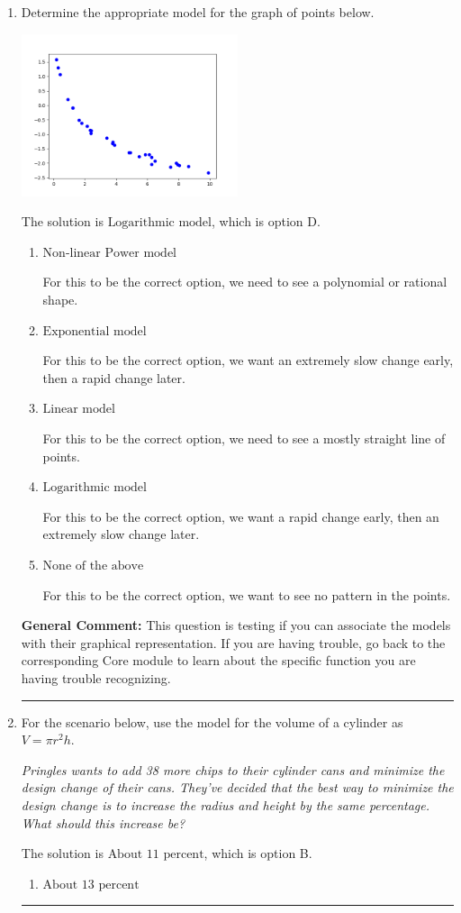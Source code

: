 \documentclass{extbook}[14pt]
\newcommand{\litem}[1]{\item #1

\rule{\textwidth}{0.4pt}}
\begin{document}
\begin{enumerate}\litem{
Determine the appropriate model for the graph of points below.

\begin{center}
    \includegraphics[width=0.5\textwidth]{../Figures/identifyModelGraph12A.png}
\end{center}


The solution is \( \text{Logarithmic model} \), which is option D.\begin{enumerate}[label=\Alph*.]
\item \( \text{Non-linear Power model} \)

For this to be the correct option, we need to see a polynomial or rational shape.
\item \( \text{Exponential model} \)

For this to be the correct option, we want an extremely slow change early, then a rapid change later.
\item \( \text{Linear model} \)

For this to be the correct option, we need to see a mostly straight line of points.
\item \( \text{Logarithmic model} \)

For this to be the correct option, we want a rapid change early, then an extremely slow change later.
\item \( \text{None of the above} \)

For this to be the correct option, we want to see no pattern in the points.
\end{enumerate}

\textbf{General Comment:} This question is testing if you can associate the models with their graphical representation. If you are having trouble, go back to the corresponding Core module to learn about the specific function you are having trouble recognizing.
}
\litem{
For the scenario below, use the model for the volume of a cylinder as $V = \pi r^2 h$.

\begin{center}
    \textit{ Pringles wants to add 38 \text{percent} more chips to their cylinder cans and minimize the design change of their cans. They've decided that the best way to minimize the design change is to increase the radius and height by the same percentage. What should this increase be? }
\end{center}
The solution is \( \text{About } 11 \text{ percent} \), which is option B.\begin{enumerate}[label=\Alph*.]
\item \( \text{About } 13 \text{ percent} \)


\end{enumerate}}
\end{enumerate}
\end{document}
